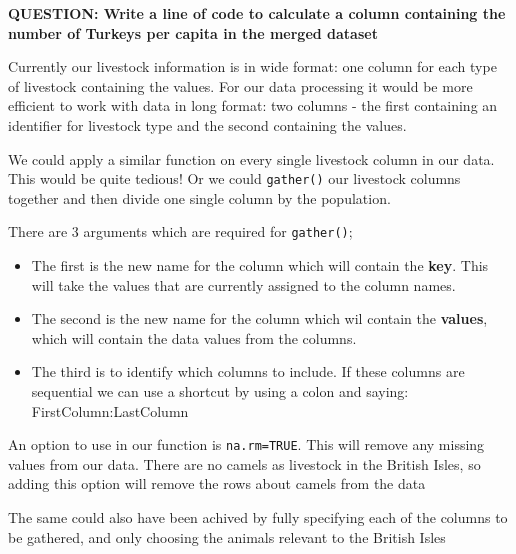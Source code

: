 \documentclass[]{book}
\newenvironment{Shaded}{\begin{snugshade}}{\end{snugshade}}
\newcommand{\DataTypeTok}[1]{\textcolor[rgb]{0.13,0.29,0.53}{#1}}
\newcommand{\KeywordTok}[1]{\textcolor[rgb]{0.13,0.29,0.53}{\textbf{#1}}}
\newcommand{\NormalTok}[1]{#1}
\newcommand{\OperatorTok}[1]{\textcolor[rgb]{0.81,0.36,0.00}{\textbf{#1}}}
\newcommand{\OtherTok}[1]{\textcolor[rgb]{0.56,0.35,0.01}{#1}}
\newcommand{\StringTok}[1]{\textcolor[rgb]{0.31,0.60,0.02}{#1}}
\begin{document}
\textbf{QUESTION: Write a line of code to calculate a column containing the number of Turkeys per capita in the merged dataset}

Currently our livestock information is in wide format: one column for each type of livestock containing the values. For our data processing it would be more efficient to work with data in long format: two columns - the first containing an identifier for livestock type and the second containing the values.

We could apply a similar function on every single livestock column in our data. This would be quite tedious! Or we could \texttt{gather()} our livestock columns together and then divide one single column by the population.

There are 3 arguments which are required for \texttt{gather()};

\begin{itemize}
\item
  The first is the new name for the column which will contain the \textbf{key}. This will take the values that are currently assigned to the column names.
\item
  The second is the new name for the column which wil contain the \textbf{values}, which will contain the data values from the columns.
\item
  The third is to identify which columns to include. If these columns are sequential we can use a shortcut by using a colon and saying: FirstColumn:LastColumn
\end{itemize}

An option to use in our function is \texttt{na.rm=TRUE}. This will remove any missing values from our data. There are no camels as livestock in the British Isles, so adding this option will remove the rows about camels from the data

\begin{Shaded}
\end{Shaded}

The same could also have been achived by fully specifying each of the columns to be gathered, and only choosing the animals relevant to the British Isles
\end{document}
